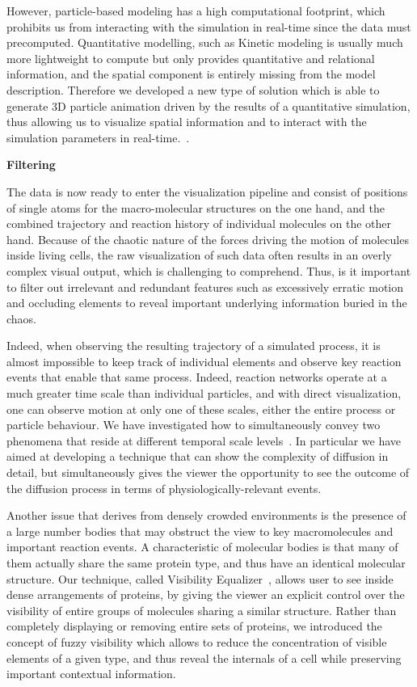 However, particle-based modeling has a high computational footprint, which prohibits us from interacting with the simulation in real-time since the data must precomputed.
Quantitative modelling, such as Kinetic modeling is usually much more lightweight to compute but only provides quantitative and relational information, and the spatial component is entirely missing from the model description.
Therefore we developed a new type of solution which is able to generate 3D particle animation driven by the results of a quantitative simulation, thus allowing us to visualize spatial information and to interact with the simulation parameters in real-time.~\cite{le2014illustrative}.

\textbf{Filtering}

The data is now ready to enter the visualization pipeline and consist of positions of single atoms for the macro-molecular structures on the one hand, and the combined trajectory and reaction history of individual molecules on the other hand.
Because of the chaotic nature of the forces driving the motion of molecules inside living cells, the raw visualization of such data often results in an overly complex visual output, which is challenging to comprehend.
Thus, is it important to filter out irrelevant and redundant features such as excessively erratic motion and occluding elements to reveal important underlying information buried in the chaos.

Indeed, when observing the resulting trajectory of a simulated process, it is almost impossible to keep track of individual elements and observe key reaction events that enable that same process. 
Indeed, reaction networks operate at a much greater time scale than individual particles, and with direct visualization, one can observe motion at only one of these scales, either the entire process or particle behaviour.
We have investigated how to simultaneously convey two phenomena that reside at different temporal scale levels~\cite{le2015illustrative}. 
In particular we have aimed at developing a technique that can show the complexity of diffusion in detail, but simultaneously gives the viewer the opportunity to see the outcome of the diffusion process in terms of physiologically-relevant events.

Another issue that derives from densely crowded environments is the presence of a large number bodies that may obstruct the view to key macromolecules and important reaction events. 
A characteristic of molecular bodies is that many of them actually share the same protein type, and thus have an identical molecular structure.
Our technique, called Visibility Equalizer~\cite{le2016visibility}, allows user to see inside dense arrangements of proteins, by giving the viewer an explicit control over the visibility of entire groups of molecules sharing a similar structure. 
Rather than completely displaying or removing entire sets of proteins, we introduced the concept of fuzzy visibility which allows to reduce the concentration of visible elements of a given type, and thus reveal the internals of a cell while preserving important contextual information.

